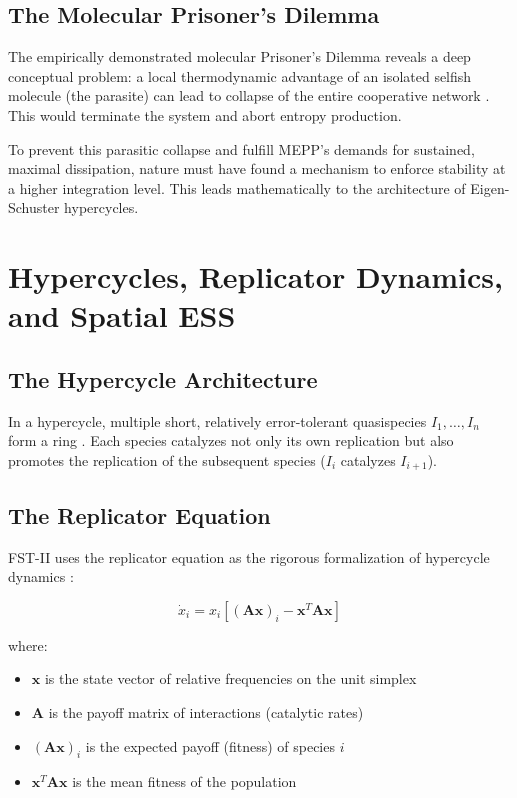 \documentclass[12pt,a4paper]{article}
\theoremstyle{remark}
\begin{document}
\subsection{The Molecular Prisoner's Dilemma}

The empirically demonstrated molecular Prisoner's Dilemma reveals a deep conceptual problem: a local thermodynamic advantage of an isolated selfish molecule (the parasite) can lead to collapse of the entire cooperative network \citep{AzoarcusPMC}. This would terminate the system and abort entropy production.

To prevent this parasitic collapse and fulfill MEPP's demands for sustained, maximal dissipation, nature must have found a mechanism to enforce stability at a higher integration level. This leads mathematically to the architecture of Eigen-Schuster hypercycles.

\section{Hypercycles, Replicator Dynamics, and Spatial ESS}
\label{sec:hypercycles}

\subsection{The Hypercycle Architecture}

In a hypercycle, multiple short, relatively error-tolerant quasispecies $I_1, \ldots, I_n$ form a ring \citep{Eigen1979}. Each species catalyzes not only its own replication but also promotes the replication of the subsequent species ($I_i$ catalyzes $I_{i+1}$).

\subsection{The Replicator Equation}

FST-II uses the replicator equation as the rigorous formalization of hypercycle dynamics \citep{ReplicatorEntropy,ReplicatorDiffusion}:

\begin{equation}
\dot{x}_i = x_i \left[ (\mathbf{A}\mathbf{x})_i - \mathbf{x}^T \mathbf{A} \mathbf{x} \right]
\end{equation}

where:
\begin{itemize}
    \item $\mathbf{x}$ is the state vector of relative frequencies on the unit simplex
    \item $\mathbf{A}$ is the payoff matrix of interactions (catalytic rates)
    \item $(\mathbf{A}\mathbf{x})_i$ is the expected payoff (fitness) of species $i$
    \item $\mathbf{x}^T \mathbf{A} \mathbf{x}$ is the mean fitness of the population
\end{itemize}
\end{document}
